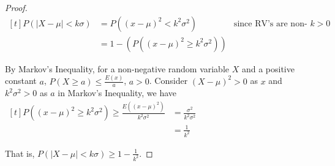 \begin{proof}
    $\begin{aligned}[t]
        P(|X - \mu| < k\sigma) & = P((x - \mu)^2 < k^2\sigma^2)         & \text{since RV's are non-nagative and } k > 0 \\
                               & = 1 - (P((x - \mu)^2 \ge k^2\sigma^2))
    \end{aligned}$

    By Markov's Inequality, for a non-negative random variable $X$ and a positive constant $a$, $P(X \ge a) \le \frac{E(x)}{a}$, $a > 0$. Consider $(X - \mu)^2 > 0$ as $x$ and $k^2\sigma^2 > 0$ as $a$ in Markov's Inequality, we have $\begin{aligned}[t]
        P((x - \mu)^2 \ge k^2\sigma^2) \ge \frac{E((x - \mu)^2)}{k^2\sigma^2} & = \frac{\sigma^2}{k^2\sigma^2} \\
                                                                              & = \frac{1}{k^2}
    \end{aligned}$

    That is, $P(|X - \mu| < k\sigma) \ge 1 - \frac{1}{k^2}$. 
\end{proof}

